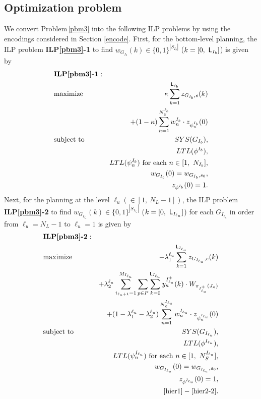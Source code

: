 \documentclass{article}
\newcommand{\req}[1]{\eqref{#1}}
\newcommand{\rpbm}[1]{Problem\,\ref{#1}}
\newcommand{\Len}{{\sf L}}
\newcommand{\Iu}{I_{\ell_u}}
\begin{document}
\subsection{Optimization problem}
We convert \rpbm{pbm3} into the following ILP problems by using the encodings considered in Section \ref{encode}. 
First, for the bottom-level planning, the ILP problem {\bf ILP\ref{pbm3}-1} to find $w_{G_{I_b}}(k)\in\{0,1\}^{|S_{I_b}|}$ ($k=[0,~\Len_{I_b}]$) is given by
\begin{eqnarray}
&\mbox{\bf ILP\ref{pbm3}-1}: &\notag\\
&\mbox{maximize}&\kappa \sum_{k=1}^{\Len_{I_b}}z_{G_{I_b},e}(k)\notag\\&&+ (1-\kappa)\sum_{n=1}^{N_S^{I_b}} w_{n}^{I_b}\cdot z_{\psi_{n}^{I_b}}(0) \notag \\
&\mbox{subject to}&SYS(G_{I_b}), \notag \\
&& LTL(\phi^{I_b}),\notag \\
&& LTL(\psi^{I_b}_n) \  {\rm{for\ each\ }}  n \in [1,\ N_{I_b}], \notag\\
&& w_{G_{I_b}}(0)=w_{G_{I_b},s_0}, \notag \\
&&z_{\phi^{I_b}} (0) = 1. \notag
\end{eqnarray}
Next, for the planning at the level $\ell_u(\in[1,~N_L-1])$, the ILP problem {\bf ILP\ref{pbm3}-2} to find $w_{G_{\Iu}}(k)\in\{0,1\}^{|S_{\Iu}|}$ ($k=[0,~\Len_{\Iu}]$) for each $G_{\Iu}$ in order from $\ell_u=N_L-1$ to $\ell_u=1$ is given by
\begin{eqnarray}
&\mbox{\bf ILP\ref{pbm3}-2}: &\notag\\
&\mbox{maximize}& 
-\lambda_1^{\ell_u} \sum_{k=1}^{\Len_{\Iu}}z_{G_{I_{\ell_u}},e}(k)
\notag\\&& + \lambda_2^{\ell_u} \sum_{i_{\ell_u+1}=1}^{M_{\Iu}} \sum_{p\in P} \sum_{k=0}^{\Len_{\Iu}} {y}^{\Iu^+}_\kappa(k) \cdot {W_{\pi_{\Iu^+}(J_\kappa)}}
\notag\\&&+ (1-\lambda_1^{\ell_u}-\lambda_2^{\ell_u})\sum_{n=1}^{N_S^{\Iu}}w_{n}^{\Iu}\cdot z_{\psi_{n}^{\Iu}}(0)
\notag \\
&\mbox{subject to}&SYS(G_{\Iu}), \notag \\
&& LTL(\phi^{\Iu}),\notag \\
&& LTL(\psi^{\Iu}_n) \  {\rm{for\ each\ }}  n \in [1,\ N_S^{\Iu}], \notag\\
&& w_{G_{\Iu}}(0)=w_{G_{\Iu},s_0}, \notag \\
&&z_{\phi^{\Iu}} (0) = 1, \notag\\
&&\req{hier1}-\req{hier2-2}.\notag
\end{eqnarray}
\end{document}
